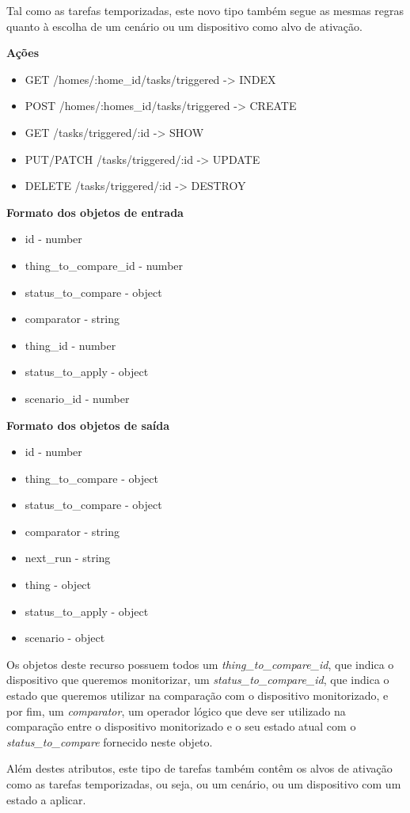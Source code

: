 Tal como as tarefas temporizadas, este novo tipo também segue as mesmas regras quanto à escolha de um cenário ou um dispositivo como alvo de ativação.

\textbf{Ações}
\begin{itemize}
    \item GET /homes/:home{\_}id/tasks/triggered -> INDEX
    \item POST /homes/:homes{\_}id/tasks/triggered -> CREATE
    \item GET /tasks/triggered/:id -> SHOW
    \item PUT/PATCH /tasks/triggered/:id -> UPDATE
    \item DELETE /tasks/triggered/:id -> DESTROY
\end{itemize}

\textbf{Formato dos objetos de entrada}
\begin{itemize}
    \item id - number
    \item thing{\_}to{\_}compare{\_}id - number
    \item status{\_}to{\_}compare - object
    \item comparator - string
    \item thing{\_}id - number
    \item status{\_}to{\_}apply - object
    \item scenario{\_}id - number
\end{itemize}

\textbf{Formato dos objetos de saída}
\begin{itemize}
    \item id - number
    \item thing{\_}to{\_}compare - object
    \item status{\_}to{\_}compare - object
    \item comparator - string
    \item next{\_}run - string
    \item thing - object
    \item status{\_}to{\_}apply - object
    \item scenario - object
\end{itemize}

Os objetos deste recurso possuem todos um \textit{thing{\_}to{\_}compare{\_}id}, que indica o dispositivo que queremos monitorizar, um \textit{status{\_}to{\_}compare{\_}id}, que indica o estado que queremos utilizar na comparação com o dispositivo monitorizado, e por fim, um \textit{comparator}, um operador lógico que deve ser utilizado na comparação entre o dispositivo monitorizado e o seu estado atual com o \textit{status{\_}to{\_}compare} fornecido neste objeto.

Além destes atributos, este tipo de tarefas também contêm os alvos de ativação como as tarefas temporizadas, ou seja, ou um cenário, ou um dispositivo com um estado a aplicar.

